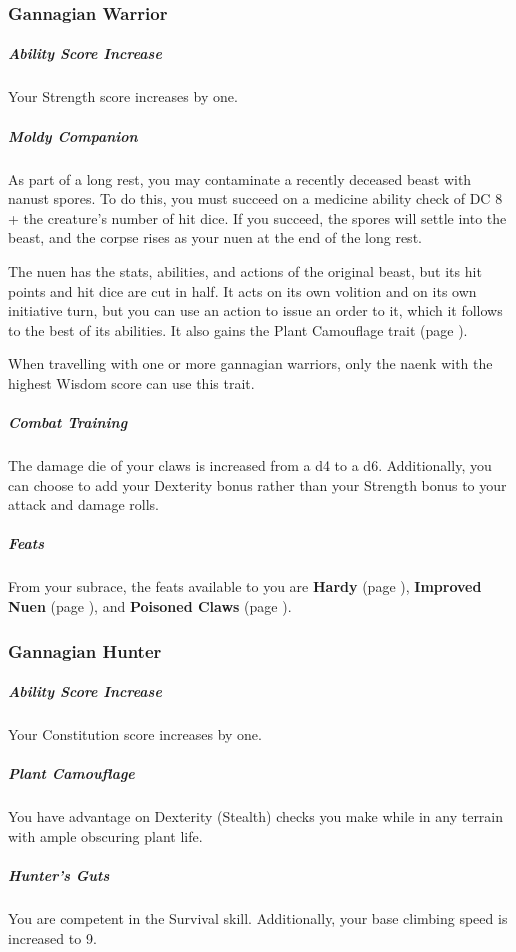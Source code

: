 \subsubsection{Gannagian Warrior}
    \subparagraph{Ability Score Increase} Your Strength score increases by one.

    \subparagraph{Moldy Companion} As part of a long rest, you may contaminate a recently deceased beast with nanust spores.
    To do this, you must succeed on a medicine ability check of DC 8 + the creature's number of hit dice.
    If you succeed, the spores will settle into the beast, and the corpse rises as your nuen at the end of the long rest.

    The nuen has the stats, abilities, and actions of the original beast, but its hit points and hit dice are cut in half.
    It acts on its own volition and on its own initiative turn, but you can use an action to issue an order to it, which it follows to the best of its abilities.
    It also gains the Plant Camouflage trait (page \pageref{trait::plantcamouflage}).

    When travelling with one or more gannagian warriors, only the naenk with the highest Wisdom score can use this trait.

    \subparagraph{Combat Training} The damage die of your claws is increased from a d4 to a d6.
    Additionally, you can choose to add your Dexterity bonus rather than your Strength bonus to your attack and damage rolls.

    \subparagraph{Feats} From your subrace, the feats available to you are
    \textbf{Hardy} (page \pageref{feat::hardy}),
    \textbf{Improved Nuen} (page \pageref{feat::improvednuen}), and
    \textbf{Poisoned Claws} (page \pageref{feat::poisonedclaws}).

\subsubsection{Gannagian Hunter}
    \subparagraph{Ability Score Increase} Your Constitution score increases by one.

    \subparagraph{Plant Camouflage} You have advantage on Dexterity (Stealth) checks you make while in any terrain with ample obscuring plant life.

    \subparagraph{Hunter's Guts} You are competent in the Survival skill.
    Additionally, your base climbing speed is increased to 9.

